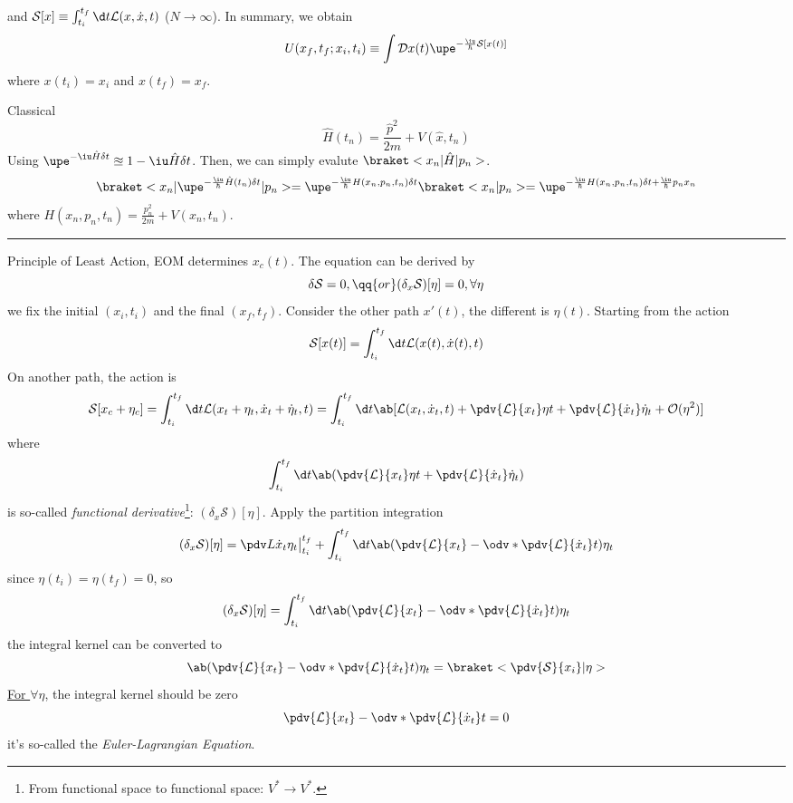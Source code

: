 \begin{enumext}[label = (\alph*)]
  and $\mathcal S[x] \equiv \int_{t_i}^{t_f} \d t \mathcal L(x,\dot x,t)$ ($N \to \infty$).
  In summary, we obtain
\begin{equation}
  U(x_f,t_f;x_i,t_i) \equiv \int \mathcal D x(t) \upe^{-\frac\iu\hbar \mathcal S[x(t)]}
\end{equation}
  where $x(t_i) = x_i$ and $x(t_f) = x_f$.
  \item Classical
  \[
    \hat H(t_n) = \frac{\hat p^2}{2m} + V(\hat x,t_n)
  \]
  Using $\upe^{-\iu\hat H\delta t} \approxeq 1 - \iu\hat H\delta t$.
  Then, we can simply evalute $\braket<x_n|\hat H|p_n>$.
  \[
    \braket<x_n|\upe^{-\frac\iu\hbar\hat H(t_n)\delta t}|p_n>
  = \upe^{-\frac\iu\hbar H(x_n,p_n,t_n)\delta t} \braket<x_n|p_n>
  = \upe^{-\frac\iu\hbar H(x_n,p_n,t_n)\delta t + \frac\iu\hbar p_nx_n}
  \]
  where $H(x_n,p_n,t_n) = \frac{p_n^2}{2m} + V(x_n,t_n)$.
  \hrule \newpage
  Principle of Least Action, EOM determines $x_c(t)$.
  The equation can be derived by
  \begin{equation}
    \delta \mathcal S = 0,\qq{or} (\delta_x\mathcal S)[\eta] = 0, \forall \eta
  \end{equation}
  we fix the initial $(x_i,t_i)$ and the final $(x_f,t_f)$. Consider the other path $x'(t)$, the different is $\eta(t)$.
  Starting from the action
  \begin{equation}
    \mathcal S[x(t)] = \int_{t_i}^{t_f} \d t \mathcal L(x(t), \dot x(t), t)
  \end{equation}
  On another path, the action is
  \[
    \mathcal S[x_c + \eta_c] = \int_{t_i}^{t_f} \d t \mathcal L(x_t + \eta_t, \dot x_t + \dot \eta_t,t)
  = \int_{t_i}^{t_f} \d t \ab[\mathcal L(x_t,\dot x_t,t) + \pdv{\mathcal L}{x_t} \eta t
  + \pdv{\mathcal L}{\dot x_t} \dot \eta_t + \mathcal O(\eta^2)]
  \]
  where
  \[
    \int_{t_i}^{t_f} \d t \ab(\pdv{\mathcal L}{x_t} \eta t
  + \pdv{\mathcal L}{\dot x_t} \dot \eta_t)
  \]
  is so-called \emph{functional derivative}\footnote{From functional space to functional space: $V^* \to V^*$.}: $(\delta_x \mathcal S)[\eta]$.
  Apply the partition integration
  \[
    (\delta_x\mathcal S)[\eta] = \pdv L{\dot x_t} \eta_t \big|_{t_i}^{t_f}
  + \int_{t_i}^{t_f} \d t\ab(\pdv{\mathcal L}{x_t} - \odv*{\pdv{\mathcal L}{\dot x_t}}t)\eta_t
  \]
  since $\eta(t_i) = \eta(t_f) = 0$, so
  \[
    (\delta_x\mathcal S)[\eta] = \int_{t_i}^{t_f} \d t\ab(\pdv{\mathcal L}{x_t} - \odv*{\pdv{\mathcal L}{\dot x_t}}t)\eta_t
  \]
  the integral kernel can be converted to
  \[
    \ab(\pdv{\mathcal L}{x_t} - \odv*{\pdv{\mathcal L}{\dot x_t}}t)\eta_t
  = \braket<\pdv{\mathcal S}{x_i}|\eta>
  \]
  \underline{For $\forall \eta$}, the integral kernel should be zero
  \begin{equation}
    \pdv{\mathcal L}{x_t} - \odv*{\pdv{\mathcal L}{\dot x_t}}t = 0
  \end{equation}
  it's so-called the \emph{Euler-Lagrangian Equation}.
\end{enumext}

